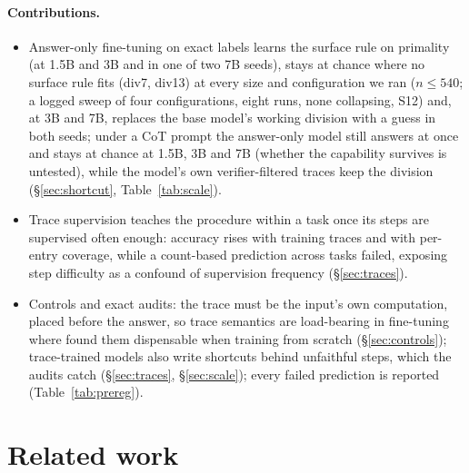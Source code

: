 \documentclass{article}
\theoremstyle{definition}
\begin{document}
\paragraph{Contributions.}
\begin{itemize}[leftmargin=*,itemsep=1pt,topsep=2pt]
\item Answer-only fine-tuning on exact labels learns the surface rule on primality (at 1.5B and 3B and in one of two 7B seeds), stays at chance where no surface rule fits (div7, div13) at every size and configuration we ran ($n\le540$; a logged sweep of four configurations, eight runs, none collapsing, S12) and, at 3B and 7B, replaces the base model's working division with a guess in both seeds; under a CoT prompt the answer-only model still answers at once and stays at chance at 1.5B, 3B and 7B (whether the capability survives is untested), while the model's own verifier-filtered traces keep the division (\S\ref{sec:shortcut}, Table~\ref{tab:scale}).
\item Trace supervision teaches the procedure within a task once its steps are supervised often enough: accuracy rises with training traces and with per-entry coverage, while a count-based prediction across tasks failed, exposing step difficulty as a confound of supervision frequency (\S\ref{sec:traces}).
\item Controls and exact audits: the trace must be the input's own computation, placed before the answer, so trace semantics are load-bearing in fine-tuning where \citet{valmeekam2026beyond} found them dispensable when training from scratch (\S\ref{sec:controls}); trace-trained models also write shortcuts behind unfaithful steps, which the audits catch (\S\ref{sec:traces}, \S\ref{sec:scale}); every failed prediction is reported (Table~\ref{tab:prereg}).
\end{itemize}

\section{Related work}
\end{document}
